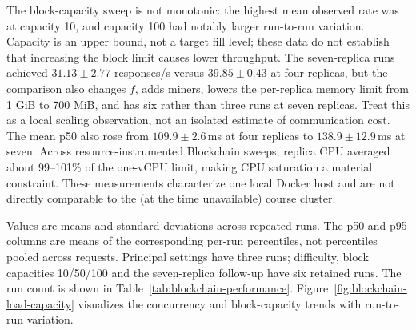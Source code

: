 \documentclass[sigconf,a4paper]{acmart}
\begin{document}
    The block-capacity sweep is not monotonic: the highest mean observed rate
    was at capacity 10, and capacity 100 had notably larger run-to-run
    variation. Capacity is an upper bound, not a target fill level; these data
    do not establish that increasing the block limit causes lower throughput.
    The seven-replica runs achieved $31.13\pm2.77$ responses/s versus
    $39.85\pm0.43$ at four replicas, but the comparison also changes $f$, adds
    miners, lowers the per-replica memory limit from 1 GiB to 700 MiB, and has
    six rather than three runs at seven replicas. Treat this as a local scaling
    observation, not an isolated estimate of communication cost. The mean p50
    also rose from $109.9\pm2.6$\,ms at four replicas to
    $138.9\pm12.9$\,ms at seven.
    Across resource-instrumented Blockchain sweeps, replica CPU averaged about
    99--101\% of the one-vCPU limit, making CPU saturation a material
    constraint. These measurements characterize one local Docker host and are
    not directly comparable to the (at the time unavailable) course cluster.

    Values are means and standard deviations across repeated runs. The p50
    and p95 columns are means of the corresponding per-run percentiles, not
    percentiles pooled across requests. Principal settings have three runs;
    difficulty, block capacities 10/50/100 and the seven-replica follow-up have
    six retained runs. The run count is shown in Table~\ref{tab:blockchain-performance}.
    Figure~\ref{fig:blockchain-load-capacity} visualizes the concurrency and
    block-capacity trends with run-to-run variation.
\end{document}

